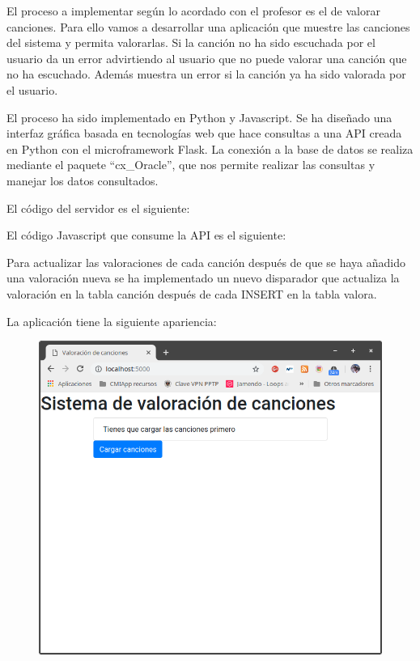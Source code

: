 \documentclass[12pt,a4paper]{article}
\begin{document}
	El proceso a implementar según lo acordado con el profesor es el de valorar canciones. Para ello vamos a desarrollar una aplicación que muestre las canciones del sistema y permita valorarlas. Si la canción no ha sido escuchada por el usuario da un error advirtiendo al usuario que no puede valorar una canción que no ha escuchado. Además muestra un error si la canción ya ha sido valorada por el usuario.
	
	El proceso ha sido implementado en Python y Javascript. Se ha diseñado una interfaz gráfica basada en tecnologías web que hace consultas a una API creada en Python con el microframework Flask. La conexión a la base de datos se realiza mediante el paquete ``cx\_Oracle'', que nos permite realizar las consultas y manejar los datos consultados.
	
	El código del servidor es el siguiente:
	


	El código Javascript que consume la API es el siguiente:
	


Para actualizar las valoraciones de cada canción después de que se haya añadido una valoración nueva se ha implementado un nuevo disparador que actualiza la valoración en la tabla canción después de cada INSERT en la tabla valora.



	La aplicación tiene la siguiente apariencia:
\begin{figure}[H]
\centering
\includegraphics[scale=0.40]{implementaciones/implementacion_javier/imagenes/intro.png}
\end{figure}
\end{document}
